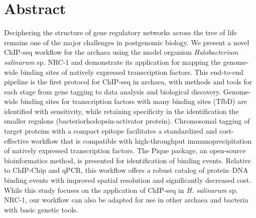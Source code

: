 \section{Abstract}

Deciphering the structure of gene regulatory networks across the tree of life remains one of the major challenges in postgenomic biology. We present a novel ChIP-seq workflow for the archaea using the model organism {\em Halobacterium salinarum} sp. NRC-1 and demonstrate its application for mapping the genome-wide binding sites of natively expressed transcription factors. This end-to-end pipeline is the first protocol for ChIP-seq in archaea, with methods and tools for each stage from gene tagging to data analysis and biological discovery. Genome-wide binding sites for transcription factors with many binding sites (TfbD) are identified with sensitivity, while retaining specificity in the identification the smaller regulons (bacteriorhodopsin-activator protein). Chromosomal tagging of target proteins with a compact epitope facilitates a standardized and cost-effective workflow that is compatible with high-throughput immunoprecipitation of natively expressed transcription factors. The Pique package, an open-source bioinformatics method, is presented for identification of binding events. Relative to ChIP-Chip and qPCR, this workflow offers a robust catalog of protein–DNA binding events with improved spatial resolution and significantly decreased cost. While this study focuses on the application of ChIP-seq in {\em H. salinarum} sp. NRC-1, our workflow can also be adapted for use in other archaea and bacteria with basic genetic tools.